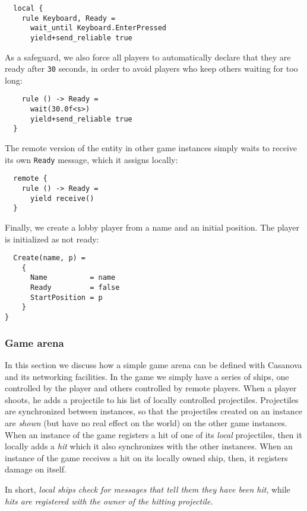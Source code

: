 \begin{lstlisting}
  local {
    rule Keyboard, Ready = 
      wait_until Keyboard.EnterPressed
      yield+send_reliable true
\end{lstlisting}

As a safeguard, we also force all players to automatically declare that they are ready after \texttt{30} seconds, in order to avoid players who keep others waiting for too long:

\begin{lstlisting}
    rule () -> Ready = 
      wait(30.0f<s>)
      yield+send_reliable true
  }
\end{lstlisting}

The remote version of the entity in other game instances simply waits to receive its own \texttt{Ready} message, which it assigns locally:

\begin{lstlisting}
  remote {
    rule () -> Ready = 
      yield receive()
  }
\end{lstlisting}

Finally, we create a lobby player from a name and an initial position. The player is initialized as not ready:

\begin{lstlisting}
  Create(name, p) = 
    {
      Name          = name
      Ready         = false
      StartPosition = p
    }
}
\end{lstlisting}


\subsubsection{Game arena}
In this section we discuss how a simple game arena can be defined with Casanova and its networking facilities. In the game we simply have a series of ships, one controlled by the player and others controlled by remote players. When a player shoots, he adds a projectile to his list of locally controlled projectiles. Projectiles are synchronized between instances, so that the projectiles created on an instance are \textit{shown} (but have no real effect on the world) on the other game instances. When an instance of the game registers a hit of one of its \textit{local} projectiles, then it locally adds a \textit{hit} which it also synchronizes with the other instances. When an instance of the game receives a hit on its locally owned ship, then, it registers damage on itself.

In short, \textit{local ships check for messages that tell them they have been hit}, while \textit{hits are registered with the owner of the hitting projectile}.

